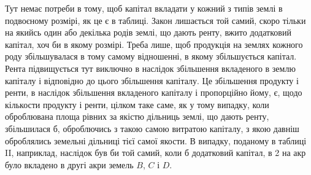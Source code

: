 \noindent{}Тут немає потреби в тому, щоб капітал вкладати у кожний з типів землі
в подвоєному розмірі, як це є в таблиці. Закон лишається той самий, скоро
тільки на якийсь один або декілька родів землі, що дають ренту, вжито додатковий капітал, хоч би в
якому розмірі. Треба лише, щоб продукція на землях
кожного роду збільшувалася в тому самому відношенні, в якому збільшується
капітал. Рента підвищується тут виключно в наслідок збільшення вкладеного
в землю капіталу і відповідно до цього збільшення капіталу. Це збільшення
продукту і ренти, в наслідок збільшення вкладеного капіталу і пропорційно
йому, є,  щодо кількости продукту і ренти, цілком таке саме, як у тому випадку,
коли оброблювана площа рівних за якістю дільниць землі, що дають ренту,
збільшилася б, оброблючись з такою самою витратою капіталу, з якою давніш оброблялись земельні
дільниці тієї самої якости. В випадку, поданому в таблиці II, наприклад, наслідок був би той самий,
коли б додатковий капітал,
в 2 на акр було вкладено в другі акри земель $B$, $C$ і $D$.
